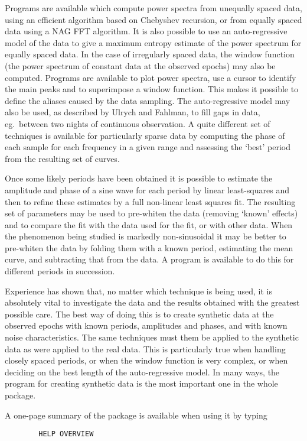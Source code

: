 Programs are available which compute power spectra from unequally spaced data,
using an efficient algorithm based on Chebyshev recursion, or from equally
spaced data using a NAG FFT algorithm.
It is also possible to use an auto-regressive model of the data to give a
maximum entropy estimate of the power spectrum for equally spaced data.
In the case of irregularly spaced data, the window function (the power spectrum
of constant data at the observed epochs) may also be computed.
Programs are available to plot power spectra, use a cursor to identify the main
peaks and to superimpose a window function.
This makes it possible to define the aliases caused by the data sampling.
The auto-regressive model may also be used, as described by Ulrych and Fahlman,
to fill gaps in data, eg.\ between two nights of continuous observation.
A quite different set of techniques is available for particularly sparse data by
computing the phase of each sample for each frequency in a given range and
assessing the `best' period from the resulting set of curves.

Once some likely periods have been obtained it is possible to estimate the
amplitude and phase of a sine wave for each period by linear least-squares and
then to refine these estimates by a full non-linear least squares fit.
The resulting set of parameters may be used to pre-whiten the data (removing
`known' effects) and to compare the fit with the data used for the fit, or with
other data.
When the phenomenon being studied is markedly non-sinusoidal it may be better
to pre-whiten the data by folding them with a known period, estimating the mean
curve, and subtracting that from the data.
A program is available to do this for different periods in succession.

Experience has shown that, no matter which technique is being used, it is
absolutely vital to investigate the data and the results obtained with the
greatest possible care.
The best way of doing this is to create synthetic data at the observed epochs
with known periods, amplitudes and phases, and with known noise characteristics.
The same techniques must them be applied to the synthetic data as were applied
to the real data.
This is particularly true when handling closely spaced periods, or when the
window function is very complex, or when deciding on the best length of the
auto-regressive model.
In many ways, the program for creating synthetic data is the most important one
in the whole package.

A one-page summary of the package is available when using it by typing
\begin{verbatim}
        HELP OVERVIEW
\end{verbatim}
